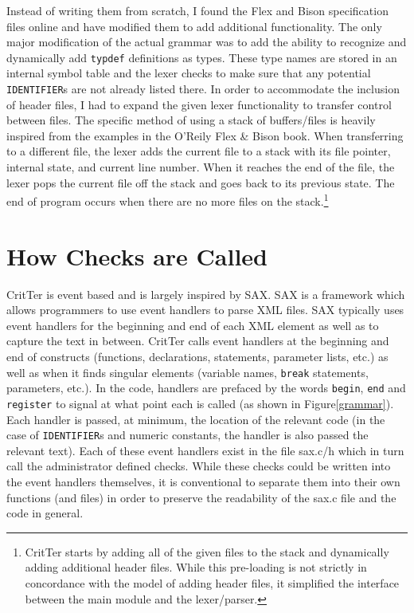 \documentclass[12pt]{report}
\def\lstlistingname{Figure}
\newcommand{\refCode}{\lstlistingname \hspace{1mm}}
\newcommand{\programName}{CritTer\xspace}
\begin{document}
Instead of writing them from scratch, I found the Flex and Bison specification files 
online\cite{originalGrammar} and have modified them to add additional functionality. The only major 
modification of the actual grammar was to add the ability to recognize and dynamically add 
\lstinline{typdef} definitions as types. These type names are stored in an internal symbol table and the 
lexer checks to make sure that any potential \lstinline{IDENTIFIER}s are not already listed there. In 
order to accommodate the inclusion of header files, I had to expand the given lexer functionality to 
transfer control between files. The specific method of using a stack of buffers/files is heavily inspired 
from the examples in the O'Reily Flex \& Bison book\cite{flex-and-bison}. When transferring to a 
different file, the lexer adds the current file to a stack with its file pointer, internal state, and current line 
number. When it reaches the end of the file, the lexer pops the current file off the stack and goes back 
to its previous state. The end of program occurs when there are no more files on the 
stack.\footnote{\programName starts by adding all of the given files to the stack and dynamically adding 
additional header files. While this pre-loading is not strictly in concordance with the model of adding 
header files, it simplified the interface between the main module and the lexer/parser.} 


\section{How Checks are Called}
\label{howChecksAreCalled}

\programName is event based and is largely inspired by SAX\cite{saxHomepage}. SAX is a 
framework which allows programmers to use event handlers to parse XML files. SAX typically uses
event handlers for the beginning and end of each XML element as well as to capture the text in 
between. \programName calls event handlers at the beginning and end of constructs (functions, 
declarations, statements, parameter lists, etc.) as well as when it finds singular elements (variable 
names, \lstinline{break} statements, parameters, etc.). In the code, handlers are prefaced by the words 
\lstinline{begin}, \lstinline{end} and \lstinline{register} to signal at what point each is called (as shown 
in \refCode \ref{grammar}). Each handler is passed, at minimum, the location of the relevant code (in 
the case of \lstinline{IDENTIFIER}s and numeric constants, the handler is also passed the relevant 
text). Each of these event handlers exist in the file sax.c/h which in turn call the administrator defined 
checks. While these checks could be written into the event handlers themselves, it is conventional to 
separate them into their own functions (and files) in order to preserve the readability of the sax.c file 
and the code in general.
\end{document}
